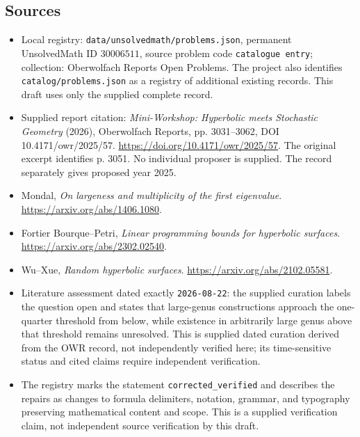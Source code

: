 \documentclass[11pt]{article}
\begin{document}
\subsection{Sources}
\begin{itemize}
\item Local registry: \texttt{data/unsolvedmath/problems.json}, permanent UnsolvedMath ID \(30006511\), source problem code \texttt{catalogue entry}; collection: Oberwolfach Reports Open Problems. The project also identifies \texttt{catalog/problems.json} as a registry of additional existing records. This draft uses only the supplied complete record.
\item Supplied report citation: \emph{Mini-Workshop: Hyperbolic meets Stochastic Geometry} (2026), Oberwolfach Reports, pp. 3031--3062, DOI 10.4171/owr/2025/57. \url{https://doi.org/10.4171/owr/2025/57}. The original excerpt identifies p. 3051. No individual proposer is supplied. The record separately gives proposed year 2025.
\item Mondal, \emph{On largeness and multiplicity of the first eigenvalue}. \url{https://arxiv.org/abs/1406.1080}.
\item Fortier Bourque--Petri, \emph{Linear programming bounds for hyperbolic surfaces}. \url{https://arxiv.org/abs/2302.02540}.
\item Wu--Xue, \emph{Random hyperbolic surfaces}. \url{https://arxiv.org/abs/2102.05581}.
\item Literature assessment dated exactly \texttt{2026-08-22}: the supplied curation labels the question open and states that large-genus constructions approach the one-quarter threshold from below, while existence in arbitrarily large genus above that threshold remains unresolved. This is supplied dated curation derived from the OWR record, not independently verified here; its time-sensitive status and cited claims require independent verification.
\item The registry marks the statement \texttt{corrected\_verified} and describes the repairs as changes to formula delimiters, notation, grammar, and typography preserving mathematical content and scope. This is a supplied verification claim, not independent source verification by this draft.
\end{itemize}
\end{document}
